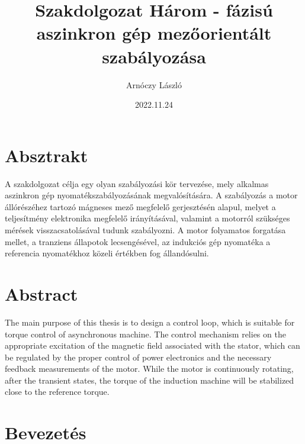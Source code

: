 \documentclass[a4paper,12pt]{article}
\title{ 
	Szakdolgozat
	\linebreak
	Három - fázisú aszinkron gép mezőorientált szabályozása}
\author{Arnóczy László}
\date{2022.11.24}
\begin{document}
		
	\section*{Absztrakt}
	A szakdolgozat célja egy olyan szabályozási kör tervezése, mely alkalmas aszinkron gép nyomatékszabályozásának megvalósítására. A szabályozás a motor állórészéhez tartozó mágneses mező megfelelő gerjesztésén alapul, melyet a teljesítmény elektronika megfelelő irányításával, valamint a motorról szükséges mérések visszacsatolásával tudunk szabályozni. A motor folyamatos forgatása mellet, a tranziens állapotok lecsengésével, az indukciós gép nyomatéka a referencia nyomatékhoz közeli értékben fog állandósulni.
	\pagebreak
	
	\section*{Abstract}
	The main purpose of this thesis is to design a control loop, which is suitable for torque control of asynchronous machine. The control mechanism relies on the appropriate excitation of the magnetic field associated with the stator, which can be regulated by the proper control of power electronics and the necessary feedback measurements of the motor. While the motor is continuously rotating, after the transient states, the torque of the induction machine will be stabilized close to the reference torque.
	\pagebreak
	
	\tableofcontents
	\pagebreak
	
	\justifying
	
	\section{Bevezetés}
	
\end{document}

